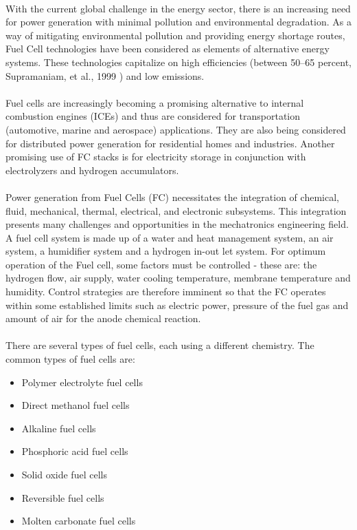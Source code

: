 \paragraph{}With the current global challenge in the energy sector, there is an increasing need for power generation with minimal pollution and environmental degradation. As a way of mitigating environmental pollution and providing energy shortage routes, Fuel Cell technologies have been considered as elements of alternative energy systems. These technologies capitalize on high efficiencies (between 50–65 percent, Supramaniam, et al., 1999 \cite{ashby_fuel_nodate}) and low emissions.
\paragraph{}Fuel cells are increasingly becoming a promising alternative to internal combustion engines (ICEs) and thus are considered for transportation (automotive, marine and aerospace) applications. They are also being considered for distributed power generation for residential homes and industries. Another promising use of FC stacks is for electricity storage in conjunction with electrolyzers and hydrogen accumulators.\cite{stefanopoulou_mechatronics_nodate}
\paragraph{}Power generation from Fuel Cells (FC) necessitates the integration of chemical, fluid,
mechanical, thermal, electrical, and electronic subsystems. This integration presents many
challenges and opportunities in the mechatronics engineering field. A fuel cell system is made up of a water and heat management system, an air system, a humidifier system and a hydrogen in-out let system. For optimum operation of the Fuel cell, some factors must be controlled - these are: the hydrogen flow, air supply, water cooling temperature, membrane temperature and humidity. Control strategies are therefore imminent so that the FC operates within some established limits such as electric power, pressure of the fuel gas and amount of air for the anode chemical reaction.
\paragraph{}There are several types of fuel cells, each using a different chemistry. The common types of fuel cells are:
\begin{itemize}
\item Polymer electrolyte fuel cells
\item Direct methanol fuel cells
\item Alkaline fuel cells
\item Phosphoric acid fuel cells
\item Solid oxide fuel cells
\item Reversible fuel cells
\item Molten carbonate fuel cells
\end{itemize}
